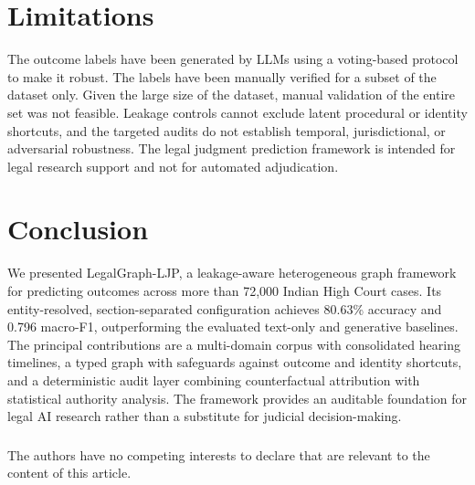 \documentclass[runningheads]{llncs}
\newcommand{\method}{LegalGraph-LJP}
\begin{document}
\section{Limitations}
The outcome labels have been generated by LLMs using a voting-based protocol to make it robust. The labels have been manually verified for a subset of the dataset only. Given the large size of the dataset, manual validation of the entire set was not feasible. Leakage controls cannot exclude latent procedural or identity shortcuts, and the targeted audits do not establish temporal, jurisdictional, or adversarial robustness. The legal judgment prediction framework is intended for legal research support and not for automated adjudication.


\section{Conclusion}
\label{sec:conclusion}

We presented \method{}, a leakage-aware heterogeneous graph framework for
predicting outcomes across more than 72{,}000 Indian High Court cases. Its
entity-resolved, section-separated configuration achieves 80.63\% accuracy
and 0.796 macro-F1, outperforming the evaluated text-only and generative
baselines. The principal contributions are a multi-domain corpus with
consolidated hearing timelines, a typed graph with safeguards against
outcome and identity shortcuts, and a deterministic audit layer combining
counterfactual attribution with statistical authority analysis. The
framework provides an auditable foundation for legal AI research rather
than a substitute for judicial decision-making.

\begin{credits}
\subsubsection{\discintname}
The authors have no competing interests to declare that are relevant to the content of this article.
\end{credits}



\end{document}
